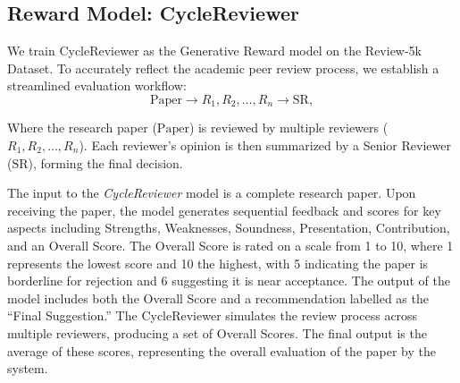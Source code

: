 \documentclass{article} %
\begin{document}






\subsection{Reward Model: CycleReviewer}
\label{sec:model1}

We train CycleReviewer as the Generative Reward model on the Review-5k Dataset. To accurately reflect the academic peer review process, we establish a streamlined evaluation workflow: \vspace{-0.1cm} \begin{equation} \text{Paper} \rightarrow R_1, R_2, \dots, R_n \rightarrow \text{SR}, \end{equation} 

Where the research paper ($\text{Paper}$) is reviewed by multiple reviewers ($R_1, R_2, \dots, R_n$). Each reviewer's opinion is then summarized by a Senior Reviewer ($\text{SR}$), forming the final decision.

The input to the \textit{CycleReviewer} model is a complete research paper. Upon receiving the paper, the model generates sequential feedback and scores for key aspects including Strengths, Weaknesses, Soundness, Presentation, Contribution, and an Overall Score. The Overall Score is rated on a scale from 1 to 10, where 1 represents the lowest score and 10 the highest, with 5 indicating the paper is borderline for rejection and 6 suggesting it is near acceptance. The output of the model includes both the Overall Score and a recommendation labelled as the ``Final Suggestion.'' The CycleReviewer simulates the review process across multiple reviewers, producing a set of Overall Scores. The final output is the average of these scores, representing the overall evaluation of the paper by the system.
\end{document}
